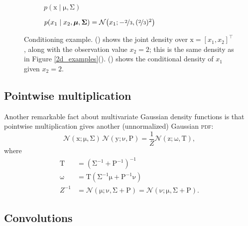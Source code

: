 \documentclass{article}
\newcommand{\acro}[1]{\textsc{\MakeLowercase{#1}}}
\newcommand{\given}{\mid}
\newcommand{\mc}[1]{\mathcal{#1}}
\newcommand{\inv}{^{-1}}
\newcommand{\trans}{^\top}
\newcommand{\mat}[1]{\bm{\mathrm{#1}}}
\renewcommand{\vec}[1]{\bm{\mathrm{#1}}}
\begin{document}
\begin{figure}
  \centering
  \begin{subfigure}[t]{0.49\textwidth}
    
    \caption{$p(\vec{x} \given \vec{\mu}, \mat{\Sigma})$}
    \label{conditional_2d_pdf}
  \end{subfigure}
  \begin{subfigure}[t]{0.49\textwidth}
    
    \caption{$p(x_1 \given x_2, \vec{\mu}, \mat{\Sigma}) =
      \mc{N}\bigl(x_1; -\nicefrac{2}{3}, (\nicefrac{2}{3})^2\bigr)$}
    \label{conditional_pdf}
  \end{subfigure}
  \caption{Conditioning example.  () shows
    the joint density over $\vec{x} = [x_1, x_2]\trans$, along with
    the observation value $x_2 = 2$; this is the same density as in
    Figure \ref{2d_examples}().
    () shows the conditional density of
    $x_1$ given $x_2 = 2$.}
  \label{conditional_example}
\end{figure}

\subsection*{Pointwise multiplication}

Another remarkable fact about multivariate Gaussian density functions
is that pointwise multiplication gives another (unnormalized) Gaussian
\acro{PDF}:
\begin{equation*}
  \mc{N}(\vec{x}; \vec{\mu}, \mat{\Sigma})
  \,
  \mc{N}(\vec{y}; \vec{\nu}, \mat{P})
  =
  \frac{1}{Z}
  \mc{N}(\vec{z}; \vec{\omega}, \mat{T}),
\end{equation*}
where
\begin{align*}
  \mat{T}
  &=
  (\mat{\Sigma}\inv + \mat{P}\inv)\inv \\
  \vec{\omega}
  &=
  \mat{T}
  (\mat{\Sigma}\inv \vec{\mu} +
  \mat{P}\inv \vec{\nu}) \\
  Z^{-1}
  &=
  \mc{N}(\vec{\mu}; \vec{\nu}, \mat{\Sigma} + \mat{P})
  =
  \mc{N}(\vec{\nu}; \vec{\mu}, \mat{\Sigma} + \mat{P}).
\end{align*}

\subsection*{Convolutions}
\end{document}
